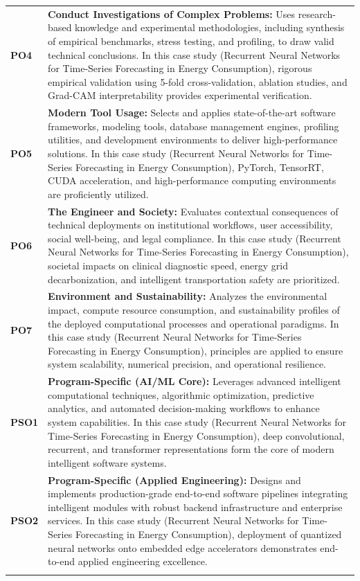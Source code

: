 {\begin{longtable}{@{}>{\centering\arraybackslash}p{1.8cm} p{13.2cm}@{}}
    \addlinespace
\textbf{PO4} & \textbf{Conduct Investigations of Complex Problems:} Uses research-based knowledge and experimental methodologies, including synthesis of empirical benchmarks, stress testing, and profiling, to draw valid technical conclusions. In this case study (Recurrent Neural Networks for Time-Series Forecasting in Energy Consumption), rigorous empirical validation using 5-fold cross-validation, ablation studies, and Grad-CAM interpretability provides experimental verification. \\
    \addlinespace
\textbf{PO5} & \textbf{Modern Tool Usage:} Selects and applies state-of-the-art software frameworks, modeling tools, database management engines, profiling utilities, and development environments to deliver high-performance solutions. In this case study (Recurrent Neural Networks for Time-Series Forecasting in Energy Consumption), PyTorch, TensorRT, CUDA acceleration, and high-performance computing environments are proficiently utilized. \\
    \addlinespace
\textbf{PO6} & \textbf{The Engineer and Society:} Evaluates contextual consequences of technical deployments on institutional workflows, user accessibility, social well-being, and legal compliance. In this case study (Recurrent Neural Networks for Time-Series Forecasting in Energy Consumption), societal impacts on clinical diagnostic speed, energy grid decarbonization, and intelligent transportation safety are prioritized. \\
    \addlinespace
\textbf{PO7} & \textbf{Environment and Sustainability:} Analyzes the environmental impact, compute resource consumption, and sustainability profiles of the deployed computational processes and operational paradigms. In this case study (Recurrent Neural Networks for Time-Series Forecasting in Energy Consumption), principles are applied to ensure system scalability, numerical precision, and operational resilience. \\
    \addlinespace
\textbf{PSO1} & \textbf{Program-Specific (AI/ML Core):} Leverages advanced intelligent computational techniques, algorithmic optimization, predictive analytics, and automated decision-making workflows to enhance system capabilities. In this case study (Recurrent Neural Networks for Time-Series Forecasting in Energy Consumption), deep convolutional, recurrent, and transformer representations form the core of modern intelligent software systems. \\
    \addlinespace
\textbf{PSO2} & \textbf{Program-Specific (Applied Engineering):} Designs and implements production-grade end-to-end software pipelines integrating intelligent modules with robust backend infrastructure and enterprise services. In this case study (Recurrent Neural Networks for Time-Series Forecasting in Energy Consumption), deployment of quantized neural networks onto embedded edge accelerators demonstrates end-to-end applied engineering excellence. \\
    \addlinespace
    \bottomrule
\end{longtable}}